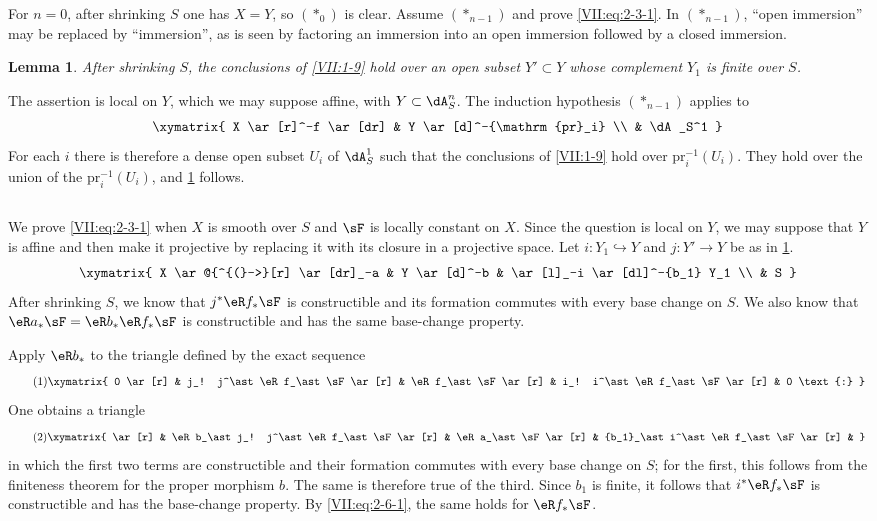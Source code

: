 \documentclass[12pt,oneside,english]{smfbook}
\newcommand{\pr}{\mathrm{pr}} %
\newtheorem{lemma_}[subsection]{Lemma}
\begin{document}
For $n=0$, after shrinking $S$ one has $X=Y$, so $(\ast_0)$ is clear. Assume $(\ast_{n-1})$ and prove \eqref{VII:eq:2-3-1}. In $(\ast_{n-1})$, ``open immersion'' may be replaced by ``immersion'', as is seen by factoring an immersion into an open immersion followed by a closed immersion.

\begin{lemma_}\label{VII:2-4}
After shrinking $S$, the conclusions of \ref{VII:1-9} hold over an open subset $Y'\subset Y$ whose complement $Y_1$ is finite over $S$.
\end{lemma_}

The assertion is local on $Y$, which we may suppose affine, with $Y\subset\dA_S^n$. The induction hypothesis $(\ast_{n-1})$ applies to
\[\xymatrix{
  X \ar[r]^-f \ar[dr]
    & Y \ar[d]^-{\pr_i} \\
  & \dA_S^1
}\]
For each $i$ there is therefore a dense open subset $U_i$ of $\dA_S^1$ such that the conclusions of \ref{VII:1-9} hold over $\pr_i^{-1}(U_i)$. They hold over the union of the $\pr_i^{-1}(U_i)$, and \ref{VII:2-4} follows.

\addtocounter{subsection}{1} %
\subsection{}\label{VII:2-6}

We prove \eqref{VII:eq:2-3-1} when $X$ is smooth over $S$ and $\sF$ is locally constant on $X$. Since the question is local on $Y$, we may suppose that $Y$ is affine and then make it projective by replacing it with its closure in a projective space. Let $i:Y_1\hookrightarrow Y$ and $j:Y'\to Y$ be as in \ref{VII:2-4}.
\[\xymatrix{
  X \ar@{^{(}->}[r] \ar[dr]_-a
    & Y \ar[d]^-b
    & \ar[l]_-i \ar[dl]^-{b_1} Y_1 \\
  & S
}\]
After shrinking $S$, we know that $j^\ast\eR f_\ast\sF$ is constructible and its formation commutes with every base change on $S$. We also know that $\eR a_\ast\sF=\eR b_\ast\eR f_\ast\sF$ is constructible and has the same base-change property.

Apply $\eR b_\ast$ to the triangle defined by the exact sequence
\begin{equation*}\tag{1}\label{VII:eq:2-6-1}
\xymatrix{
  0 \ar[r]
    & j_! j^\ast \eR f_\ast \sF \ar[r]
    & \eR f_\ast \sF \ar[r]
    & i_! i^\ast \eR f_\ast \sF \ar[r]
    & 0 \text{:}
}
\end{equation*}
One obtains a triangle
\begin{equation*}\tag{2}\label{VII:eq:2-6-2}
\xymatrix{
  \ar[r]
    & \eR b_\ast j_! j^\ast \eR f_\ast \sF \ar[r]
    & \eR a_\ast \sF \ar[r]
    & {b_1}_\ast i^\ast \eR f_\ast \sF \ar[r]
    &
}
\end{equation*}
in which the first two terms are constructible and their formation commutes with every base change on $S$; for the first, this follows from the finiteness theorem for the proper morphism $b$. The same is therefore true of the third. Since $b_1$ is finite, it follows that $i^\ast\eR f_\ast\sF$ is constructible and has the base-change property. By \eqref{VII:eq:2-6-1}, the same holds for $\eR f_\ast\sF$.
\end{document}

